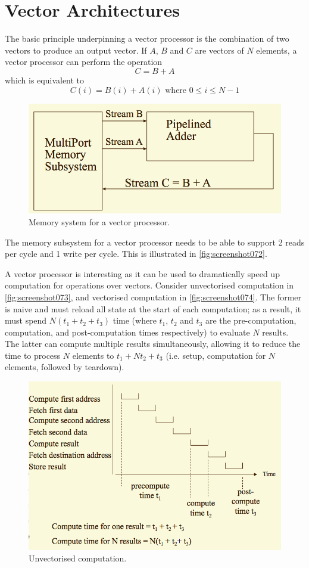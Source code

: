 \chapter{Vector Architectures}
The basic principle underpinning a vector processor is the combination of two vectors to produce an output vector. If $A$, $B$ and $C$ are vectors of $N$ elements, a vector processor can perform the operation
\[ C = B + A \]
which is equivalent to
\[ C(i) = B(i) + A(i) \text{ where } 0 \le i \le N-1 \]

\begin{figure}
\centering
\includegraphics[width=0.7\linewidth]{screenshot072}
\caption{Memory system for a vector processor.}
\label{fig:screenshot072}
\end{figure}

The memory subsystem for a vector processor needs to be able to support 2 reads per cycle and 1 write per cycle. This is illustrated in \autoref{fig:screenshot072}.

A vector processor is interesting as it can be used to dramatically speed up computation for operations over vectors. Consider unvectorised computation in \autoref{fig:screenshot073}, and vectorised computation in \autoref{fig:screenshot074}. The former is naive and must reload all state at the start of each computation; as a result, it must spend $N(t_1 + t_2 + t_3)$ time (where $t_1$, $t_2$ and $t_3$ are the pre-computation, computation, and post-computation times respectively) to evaluate $N$ results. The latter can compute multiple results simultaneously, allowing it to reduce the time to process $N$ elements to $t_1 + Nt_2 + t_3$ (i.e. setup, computation for $N$ elements, followed by teardown).

\begin{figure}
\centering
\includegraphics[width=0.7\linewidth]{screenshot073}
\caption{Unvectorised computation.}
\label{fig:screenshot073}
\end{figure}

